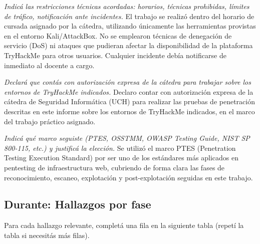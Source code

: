 \documentclass[11pt,a4paper]{article}
\begin{document}
\begin{campo}
\textit{Indicá las restricciones técnicas acordadas: horarios, técnicas prohibidas, límites de tráfico, notificación ante incidentes.}
El trabajo se realizó dentro del horario de cursada asignado por la cátedra, utilizando únicamente las herramientas provistas en el entorno Kali/AttackBox. No se emplearon técnicas de denegación de servicio (DoS) ni ataques que pudieran afectar la disponibilidad de la plataforma TryHackMe para otros usuarios. Cualquier incidente debía notificarse de inmediato al docente a cargo.\\\vspace{0.5cm}
\end{campo}

\begin{campo}[Autorización]
\textit{Declará que contás con autorización expresa de la cátedra para trabajar sobre los entornos de TryHackMe indicados.}
Declaro contar con autorización expresa de la cátedra de Seguridad Informática (UCH) para realizar las pruebas de penetración descritas en este informe sobre los entornos de TryHackMe indicados, en el marco del trabajo práctico asignado.\\\vspace{0.3cm}
\end{campo}

\begin{campo}
\textit{Indicá qué marco seguiste (PTES, OSSTMM, OWASP Testing Guide, NIST SP 800-115, etc.) y justificá la elección.}
Se utilizó el marco PTES (Penetration Testing Execution Standard) por ser uno de los estándares más aplicados en pentesting de infraestructura web, cubriendo de forma clara las fases de reconocimiento, escaneo, explotación y post-explotación seguidas en este trabajo.\\\vspace{0.5cm}
\end{campo}

\subsection{Durante: Hallazgos por fase}

Para cada hallazgo relevante, completá una fila en la siguiente tabla (repetí la tabla si necesitás más filas).
\end{document}
